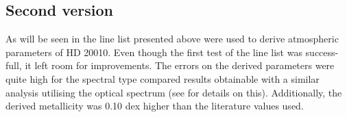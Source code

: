 \subsection{Second version}
\label{sec:linelist_second}

As will be seen in  the line list presented above were used to derive
atmospheric parameters of HD 20010. Even though the first test of the line list was success-full,
it left room for improvements. The errors on the derived parameters were quite high for the spectral
type compared results obtainable with a similar analysis utilising the optical spectrum (see
 for details on this).
Additionally, the derived metallicity was 0.10 dex higher than the literature values used.


